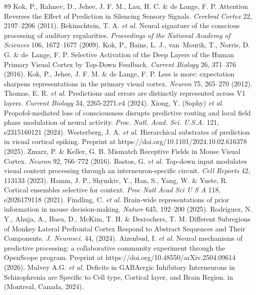 \documentclass[12pt]{article}
\begin{document}
\begin{thebibliography}{89}
 Kok, P., Rahnev, D., Jehee, J. F. M., Lau, H. C. \& de Lange, F. P. Attention Reverses the Effect of Prediction in Silencing Sensory Signals. \emph{Cerebral Cortex} 22, 2197--2206 (2011).
 Bekinschtein, T. A. \emph{et al.} Neural signature of the conscious processing of auditory regularities. \emph{Proceedings of the National Academy of Sciences} 106, 1672--1677 (2009).
 Kok, P., Bains, L. J., van~Mourik, T., Norris, D. G. \& de~Lange, F. P. Selective Activation of the Deep Layers of the Human Primary Visual Cortex by Top-Down Feedback. \emph{Current Biology} 26, 371--376 (2016).
 Kok, P., Jehee, J. F. M. \& de Lange, F. P. Less is more: expectation sharpens representations in the primary visual cortex. \emph{Neuron} 75, 265--270 (2012).
 Thomas, E. R. \emph{et al.} Predictions and errors are distinctly represented across V1 layers. \emph{Current Biology} 34, 2265-2271.e4 (2024).
 Xiong, Y. (Sophy) \emph{et al.} Propofol-mediated loss of consciousness disrupts predictive routing and local field phase modulation of neural activity. \emph{Proc. Natl. Acad. Sci. U.S.A.} 121, e2315160121 (2024).
 Westerberg, J. A. \emph{et al.} Hierarchical substrates of prediction in visual cortical spiking. Preprint at https://doi.org/10.1101/2024.10.02.616378 (2025).
 Zmarz, P. \& Keller, G. B. Mismatch Receptive Fields in Mouse Visual Cortex. \emph{Neuron} 92, 766--772 (2016).
 Bastos, G. \emph{et al.} Top-down input modulates visual context processing through an interneuron-specific circuit. \emph{Cell Reports} 42, 113133 (2023).
 Hamm, J. P., Shymkiv, Y., Han, S., Yang, W. \& Yuste, R. Cortical ensembles selective for context. \emph{Proc Natl Acad Sci U S A} 118, e2026179118 (2021).
 Findling, C. \emph{et al.} Brain-wide representations of prior information in mouse decision-making. \emph{Nature} 645, 192--200 (2025).
 Rodriguez, N. Y., Ahuja, A., Basu, D., McKim, T. H. \& Desrochers, T. M. Different Subregions of Monkey Lateral Prefrontal Cortex Respond to Abstract Sequences and Their Components. \emph{J. Neurosci.} 44, (2024).
 Aizenbud, I. \emph{et al.} Neural mechanisms of predictive processing: a collaborative community experiment through the OpenScope program. Preprint at https://doi.org/10.48550/arXiv.2504.09614 (2026).
 Mulvey A.G. \emph{et al.} Deficits in GABAergic Inhibitory Interneurons in Schizophrenia are Specific to Cell type, Cortical layer, and Brain Region. in (Montreal, Canada, 2024).

\end{thebibliography}
\end{document}
